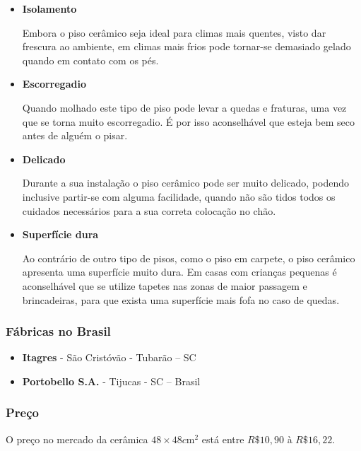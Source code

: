	\begin{itemize}

	\item \textbf{Isolamento}

	Embora o piso cerâmico seja ideal para climas mais quentes, visto dar frescura ao ambiente, em climas mais frios pode tornar-se demasiado gelado quando em contato com os pés.

	\item \textbf{Escorregadio}
	
	Quando molhado este tipo de piso pode levar a quedas e fraturas, uma vez que se torna muito escorregadio. É por isso aconselhável que esteja bem seco antes de alguém o pisar.

	\item \textbf{Delicado}
	
	Durante a sua instalação o piso cerâmico pode ser muito delicado, podendo inclusive partir-se com alguma facilidade, quando não são tidos todos os cuidados necessários para a sua correta colocação no chão.

	\item \textbf{Superfície dura}
	
	Ao contrário de outro tipo de pisos, como o piso em carpete, o piso cerâmico apresenta uma superfície muito dura. Em casas com crianças pequenas é aconselhável que se utilize tapetes nas zonas de maior passagem e brincadeiras, para que exista uma superfície mais fofa no caso de quedas.

	\end{itemize}

\subsubsection*{\textbf{Fábricas no Brasil}}

	\begin{itemize}

	\item \textbf{Itagres} - São Cristóvão - Tubarão – SC

	\item \textbf{Portobello S.A.} - Tijucas - SC – Brasil

	\end{itemize}

\subsubsection*{\textbf{Preço}}
	
	O preço no mercado da cerâmica $48\times48 c\si{\meter}^{2}$ está entre $R\$ 10,90$ à $R\$ 16,22$.

